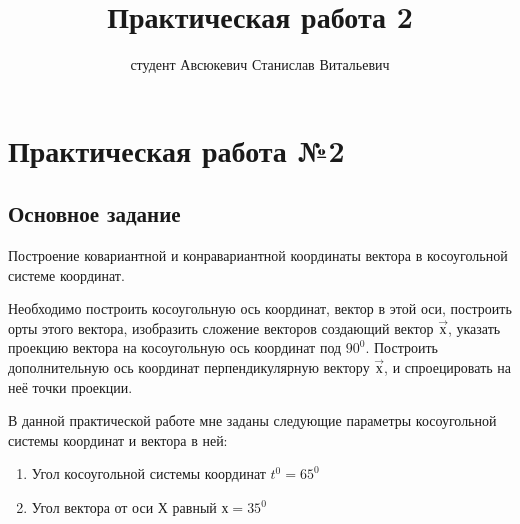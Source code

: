 \documentclass[a4paper,12pt]{article}
\title{Практическая работа 2}
\author{студент Авсюкевич Станислав Витальевич}
\begin{document}
\maketitle

\section{Практическая работа №2}
\subsection{Основное задание}
Построение ковариантной и конравариантной координаты вектора в косоугольной системе координат.

Необходимо построить косоугольную ось координат, вектор в этой оси, построить орты этого вектора, изобразить сложение векторов создающий вектор $\vec{х}$, указать проекцию вектора на косоугольную ось координат под $90^0$. Построить дополнительную ось координат перпендикулярную вектору $\vec{х}$, и спроецировать на неё точки проекции.

В данной практической работе мне заданы следующие параметры косоугольной системы координат и вектора в ней:
\begin{enumerate}
	\item Угол косоугольной системы координат $t^0=65^0$
	\item Угол вектора от оси Х равный $х=35^0$
\end{enumerate}
\end{document}
